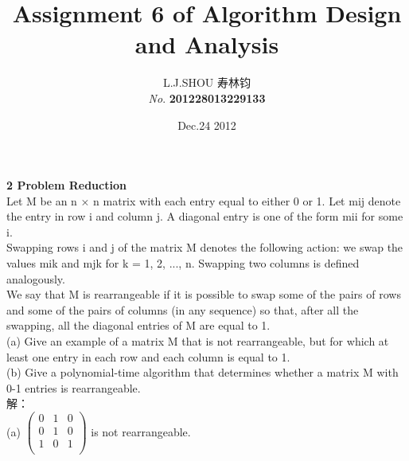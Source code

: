 \documentclass[11pt]{article}
\begin{document}
\begin{CJK}{UTF8}{gkai}
\title{ \textbf{Assignment 6 of Algorithm Design and Analysis}}
\author{L.J.SHOU  寿林钧\\{\slshape No}. \bf 201228013229133}
\date{Dec.24 2012}
\maketitle %
\noindent
{\bf \large  2 Problem Reduction}\\[2mm]
Let M be an n × n matrix with each entry equal to either 0 or 1. Let mij denote
the entry in row i and column j. A diagonal entry is one of the form mii for
some i.\\
Swapping rows i and j of the matrix M denotes the following action: we
swap the values mik and mjk for k = 1, 2, ..., n. Swapping two columns is defined
analogously.\\
We say that M is rearrangeable if it is possible to swap some of the pairs of
rows and some of the pairs of columns (in any sequence) so that, after all the
swapping, all the diagonal entries of M are equal to 1.\\
\indent
(a) Give an example of a matrix M that is not rearrangeable, but for which
at least one entry in each row and each column is equal to 1.\\
\indent
(b) Give a polynomial-time algorithm that determines whether a matrix M
with 0-1 entries is rearrangeable.\\
解：\\
(a)
$\left(
  \begin{array}{ccc}
    0 & 1 & 0 \\
    0 & 1 & 0 \\
    1 & 0 & 1 \\
  \end{array}
\right)$
is not rearrangeable.\\

\end{CJK}
\end{document}

